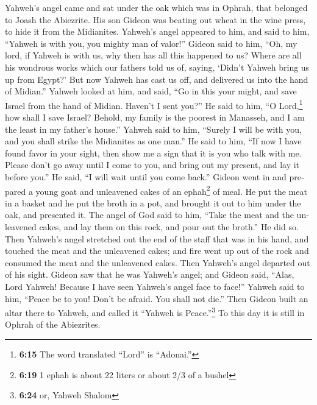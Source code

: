 \begin{paracol}{2}
\begin{otherlanguage}{english}
 Yahweh's angel came and sat under the oak which was in
Ophrah, that belonged to Joash the Abiezrite. His son Gideon was beating
out wheat in the wine press, to hide it from the Midianites.
 Yahweh's angel appeared to him, and said to him,
``Yahweh is with you, you mighty man of valor!''  Gideon
said to him, ``Oh, my lord, if Yahweh is with us, why then has all this
happened to us? Where are all his wondrous works which our fathers told
us of, saying, `Didn't Yahweh bring us up from Egypt?' But now Yahweh
has cast us off, and delivered us into the hand of Midian.''
 Yahweh looked at him, and said, ``Go in this your might,
and save Israel from the hand of Midian. Haven't I sent you?''
 He said to him, ``O Lord,\footnote{\textbf{6:15} The
  word translated ``Lord'' is ``Adonai.''} how shall I save Israel?
Behold, my family is the poorest in Manasseh, and I am the least in my
father's house.''  Yahweh said to him, ``Surely I will be
with you, and you shall strike the Midianites as one man.''
 He said to him, ``If now I have found favor in your
sight, then show me a sign that it is you who talk with me.
 Please don't go away until I come to you, and bring out
my present, and lay it before you.'' He said, ``I will wait until you
come back.''  Gideon went in and prepared a young goat
and unleavened cakes of an ephah\footnote{\textbf{6:19} 1 ephah is about
  22 liters or about 2/3 of a bushel} of meal. He put the meat in a
basket and he put the broth in a pot, and brought it out to him under
the oak, and presented it.  The angel of God said to him,
``Take the meat and the unleavened cakes, and lay them on this rock, and
pour out the broth.'' He did so.  Then Yahweh's angel
stretched out the end of the staff that was in his hand, and touched the
meat and the unleavened cakes; and fire went up out of the rock and
consumed the meat and the unleavened cakes. Then Yahweh's angel departed
out of his sight.  Gideon saw that he was Yahweh's angel;
and Gideon said, ``Alas, Lord Yahweh! Because I have seen Yahweh's angel
face to face!''  Yahweh said to him, ``Peace be to you!
Don't be afraid. You shall not die.''  Then Gideon built
an altar there to Yahweh, and called it ``Yahweh is Peace.''\footnote{\textbf{6:24}
  or, Yahweh Shalom} To this day it is still in Ophrah of the
Abiezrites.

\hypertarget{appearance-of-gideon-against-baal-his-salvation-through-his-father-raise-an-army-against-the-midianites-his-double-proof-of-god}{%
}
\end{otherlanguage}
\end{paracol}
